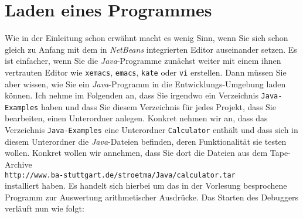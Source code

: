 \documentclass{article}
\begin{document}
\section{Laden eines Programmes}
Wie in der Einleitung schon erw\"ahnt macht es wenig Sinn, wenn Sie sich schon gleich zu
Anfang mit dem in \textsl{NetBeans} integrierten Editor auseinander setzen.  Es ist
einfacher, wenn Sie die \textsl{Java}-Programme zun\"achst weiter mit einem ihnen vertrauten
Editor wie \texttt{xemacs}, \texttt{emacs}, \texttt{kate} oder \texttt{vi} erstellen.  Dann m\"ussen Sie
aber wissen, wie Sie ein \textsl{Java}-Programm in die Entwicklungs-Umgebung laden k\"onnen.
Ich nehme im Folgenden an, dass Sie irgendwo ein Verzeichnis \texttt{Java-Examples} haben 
und dass Sie  diesem Verzeichnis f\"ur jedes Projekt, dass Sie bearbeiten, einen Unterordner
anlegen.  Konkret nehmen wir an, dass das Verzeichnis \texttt{Java-Examples} eine
Unterordner \texttt{Calculator} enth\"alt und dass sich in diesem Unterordner die
\textsl{Java}-Dateien befinden, deren Funktionalit\"at sie testen wollen.  
Konkret wollen wir annehmen, dass Sie dort die Dateien aus dem Tape-Archive
\\[0.1cm]
\hspace*{1.3cm}
\texttt{http://www.ba-stuttgart.de/stroetma/Java/calculator.tar} \\[0.1cm]
installiert haben.  Es handelt sich hierbei um das in der Vorlesung besprochene Programm
zur Auswertung arithmetischer Ausdr\"ucke. Das Starten des Debuggers verl\"auft nun wie folgt:
\end{document}
